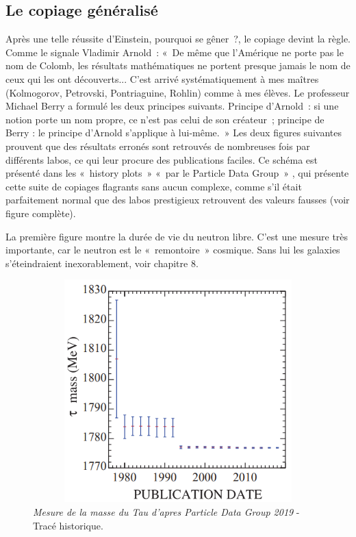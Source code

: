 \documentclass[a4paper,12pt]{article}
\begin{document}
\subsection {Le copiage généralisé}

Après une telle réussite d’Einstein, pourquoi se gêner ?, le copiage devint la règle. Comme le signale Vladimir Arnold : « De même que l’Amérique ne porte pas le nom de Colomb, les résultats mathématiques ne portent presque jamais le nom de ceux qui les ont découverts... C’est arrivé systématiquement à mes maîtres (Kolmogorov, Petrovski, Pontriaguine, Rohlin) comme à mes élèves. Le professeur Michael Berry a formulé les deux principes suivants. Principe d’Arnold : si une notion porte un nom propre, ce n’est pas celui de son créateur ; principe de Berry : le principe d’Arnold s'applique à lui-même. » 
Les deux figures suivantes prouvent que des résultats erronés sont retrouvés de nombreuses fois par différents labos, ce qui leur procure des publications faciles. Ce schéma est présenté dans les « history plots » « par le Particle Data Group » \cite{Tanabashi}, qui présente cette suite de copiages flagrants sans aucun complexe, comme s’il était parfaitement normal que des labos prestigieux retrouvent des valeurs fausses (voir figure complète). 

La première figure montre la durée de vie du neutron libre. C’est une mesure très importante, car le neutron est le « remontoire » cosmique. Sans lui les galaxies s’éteindraient inexorablement, voir chapitre 8.


\begin{figure}
\centering
\includegraphics[width=13.5cm,height=8.6cm]{./figures/tau-mass-pdg.png}
\caption [Mesures de la masse du Tau depuis 1978]{\textit{Mesure de la masse du Tau d'apres Particle Data Group 2019} - Tracé historique.} 
\label{fig:7:figure7}
\end{figure}
\end{document}
